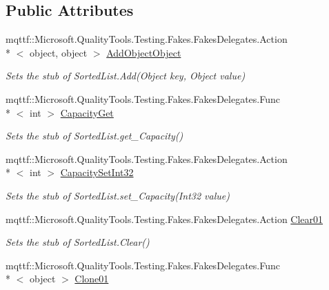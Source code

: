 \subsection*{Public Attributes}
\begin{DoxyCompactItemize}
\item 
mqttf\-::\-Microsoft.\-Quality\-Tools.\-Testing.\-Fakes.\-Fakes\-Delegates.\-Action\\*
$<$ object, object $>$ \hyperlink{class_system_1_1_collections_1_1_fakes_1_1_stub_sorted_list_ac134acfcb8834d2a709c29e302500e71}{Add\-Object\-Object}
\begin{DoxyCompactList}\small\item\em Sets the stub of Sorted\-List.\-Add(\-Object key, Object value)\end{DoxyCompactList}\item 
mqttf\-::\-Microsoft.\-Quality\-Tools.\-Testing.\-Fakes.\-Fakes\-Delegates.\-Func\\*
$<$ int $>$ \hyperlink{class_system_1_1_collections_1_1_fakes_1_1_stub_sorted_list_ab992317acfa7c584635661d0a33527d8}{Capacity\-Get}
\begin{DoxyCompactList}\small\item\em Sets the stub of Sorted\-List.\-get\-\_\-\-Capacity()\end{DoxyCompactList}\item 
mqttf\-::\-Microsoft.\-Quality\-Tools.\-Testing.\-Fakes.\-Fakes\-Delegates.\-Action\\*
$<$ int $>$ \hyperlink{class_system_1_1_collections_1_1_fakes_1_1_stub_sorted_list_ab3e3be9d5e68515038767798cf45662a}{Capacity\-Set\-Int32}
\begin{DoxyCompactList}\small\item\em Sets the stub of Sorted\-List.\-set\-\_\-\-Capacity(\-Int32 value)\end{DoxyCompactList}\item 
mqttf\-::\-Microsoft.\-Quality\-Tools.\-Testing.\-Fakes.\-Fakes\-Delegates.\-Action \hyperlink{class_system_1_1_collections_1_1_fakes_1_1_stub_sorted_list_aba2812ce55be7ee875e0b47f829215df}{Clear01}
\begin{DoxyCompactList}\small\item\em Sets the stub of Sorted\-List.\-Clear()\end{DoxyCompactList}\item 
mqttf\-::\-Microsoft.\-Quality\-Tools.\-Testing.\-Fakes.\-Fakes\-Delegates.\-Func\\*
$<$ object $>$ \hyperlink{class_system_1_1_collections_1_1_fakes_1_1_stub_sorted_list_a860f9f8b3a9cf7df55dda030420feb08}{Clone01}

\end{DoxyCompactItemize}
